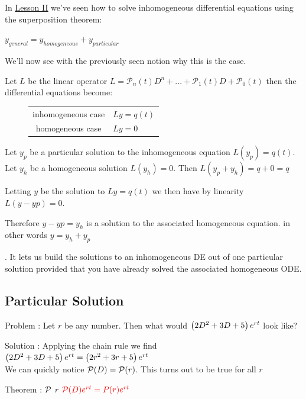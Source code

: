 \documentclass[11pt, openright]{book}
\begin{document}
In \hyperlink{page.9}{\underline{Lesson II}} we've seen how to solve inhomogeneous differential equations using the superposition theorem:\\
\centerline{$y_{general}=y_{homogeneous}+y_{particular}$}

We'll now see with the previously seen notion why this is the case.

Let $L$ be the linear operator $L=\mathcal{P}_n(t)D^n+...+\mathcal{P}_1(t)D+\mathcal{P}_0(t)$ then the differential equations become:\vspace{-8pt}

\begin{figure}[ht]
    \renewcommand{\arraystretch}{1.5}
    {\setlength{\tabcolsep}{2em}
        \begin{tabular}{c l}
            inhomogeneous case & $Ly=q(t)$ \\
            homogeneous case   & $Ly=0$
        \end{tabular}}
\end{figure}

Let $y_p$ be a particular solution to the inhomogeneous equation $L(y_p)=q(t)$. Let $y_h$ be a homogeneous solution $L(y_h)=0$. Then $L(y_p+y_h)=q+0=q$

Letting $y$ be the solution to $Ly=q(t)$ we then have by linearity $L(y-yp)=0$.

Therefore $y-yp=y_h$ is a solution to the associated homogeneous equation. in other words $y=y_h+y_p$

. It lets us build  the solutions to an inhomogeneous DE out of one particular solution provided that you have already solved the associated homogeneous ODE.

\newpage

\subsection{Particular Solution}

\begin{dent}{Problem :}
    Let $r$ be any number. Then what would $\lr{2D^2+3D+5}e^{rt}$ look like?
\end{dent}
\begin{dent}{Solution :}
    Applying the chain rule we find $\lr{2D^2+3D+5}e^{rt}=\lr{2r^2+3r+5}e^{rt}$\\
    We can quickly notice $\P(D)=\P(r)$. This turns out to be true for all $r$

\end{dent}
\begin{dent}{Theorem :}
     $\P$  $r$ \red{:} $\color{red}\P(D)e^{rt}=P(r)e^{rt}$
\end{dent}
\end{document}
